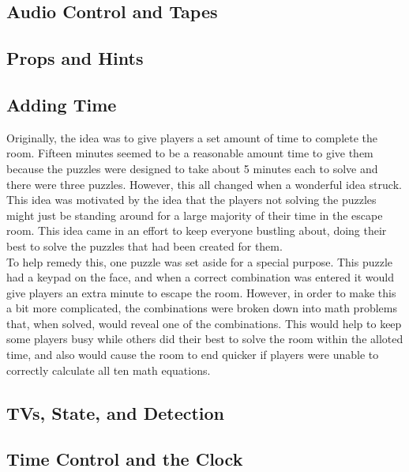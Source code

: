 \documentclass[conference]{IEEEtran}
\begin{document}
\subsection{Audio Control and Tapes} %

\subsection{Props and Hints} %

\subsection{Adding Time} %
Originally, the idea was to give players a set amount of time to complete the room. Fifteen minutes seemed to be a reasonable amount
time to give them because the puzzles were designed to take about 5 minutes each to solve and there were three puzzles. However,
this all changed when a wonderful idea struck. This idea was motivated by the idea that the players not solving the puzzles might
just be standing around for a large majority of their time in the escape room. This idea came in an effort to keep everyone bustling about, doing
their best to solve the puzzles that had been created for them.
\\
\indent To help remedy this, one puzzle was set aside for a special purpose. This puzzle had a keypad on the face, and when a correct combination was
entered it would give players an extra minute to escape the room. However, in order to make this a bit more complicated, the combinations were broken down
into math problems that, when solved, would reveal one of the combinations. This would help to keep some players busy while others did their best to solve
the room within the alloted time, and also would cause the room to end quicker if players were unable to correctly calculate all ten math equations.

\subsection{TVs, State, and Detection} %

\subsection{Time Control and the Clock} %
\end{document}
